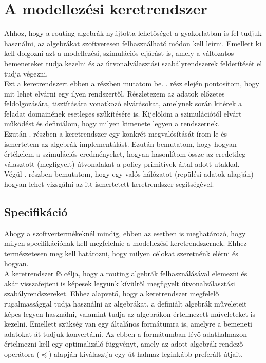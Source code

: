 \chapter{A modellezési keretrendszer}\label{framework}
Ahhoz, hogy a routing algebrák nyújtotta lehetőséget a gyakorlatban is fel tudjuk használni, az algebrákat szoftveresen felhasználható módon kell leírni. Emellett ki kell dolgozni azt a modellezési, szimulációs eljárást is, amely a változatos bemeneteket tudja kezelni és az útvonalválasztási szabályrendszerek felderítését el tudja végezni.\\

Ezt a keretrendszert ebben a részben mutatom be. . rész elején pontosítom, hogy mit lehet elvárni egy ilyen rendszertől. Részletezem az adatok előzetes feldolgozására, tisztítására vonatkozó elvárásokat, amelynek során kitérek a feladat domainének esetleges szűkítésére is. Kijelölöm a szimulációtól elvárt működést és definiálom, hogy milyen kimenete legyen a rendszernek.\\
Ezután . részben a keretrendszer egy konkrét megvalósítását írom le és ismertetem az algebrák implementálást. Ezután bemutatom, hogy hogyan értékelem a szimulációs eredményeket, hogyan hasonlítom össze az eredetileg választott (megfigyelt) útvonalakat a policy primitívek által adott utakkal.\\
Végül . részben bemutatom, hogy egy valós hálózatot (repülési adatok alapján) hogyan lehet vizsgálni az itt ismertetett keretrendszer segítségével.

  \section{Specifikáció}\label{section_specification}
  Ahogy a szoftvertermékeknél mindig, ebben az esetben is meghatározó, hogy milyen specifikációnak kell megfelelnie a modellezési keretrendszernek. Ehhez természetesen meg kell határozni, hogy milyen célokat szeretnénk elérni és hogyan.\\

  A keretrendszer fő célja, hogy a routing algebrák felhasználásával elemezni és akár visszafejteni is képesek legyünk kívülről megfigyelt útvonalválasztási szabályrendszereket. Ehhez alapvető, hogy a keretrendszer megfelelő rugalmassággal tudja használni az algebrákat, a definiált algebrák műveleteit képes legyen használni, valamint tudja az algebrákon értelmezett műveleteket is kezelni. Emellett szükség van egy általános formátumra is, amelyre a bemeneti adatokat át tudjuk konvertálni. Az ebben a formátumban lévő adathalmazon értelmezni kell egy optimalizáló függvényt, amely az adott algebrák rendező operátora ($\preceq$) alapján kiválasztja egy út halmaz leginkább preferált útjait.

